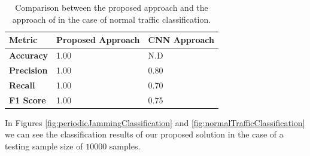 \documentclass[futureinternet,article,submit,pdftex,moreauthors]{Definitions/mdpi}
\begin{document}
\begin{table}[H]
	\caption{Comparison between the proposed approach and the approach of \cite{JammingDetectionIoT-Hussain} in the case of normal traffic classification.}\label{tab:normal_traffic_comparison}
	\begin{tabularx}{\textwidth}{CCC}
	\toprule
	\textbf{Metric} & \textbf{Proposed Approach} & \textbf{CNN Approach} \\
	\midrule
	\textbf{Accuracy}  & 1.00 & N.D \\
	\textbf{Precision} & 1.00 & 0.80 \\
	\textbf{Recall}    & 1.00 & 0.70 \\
	\textbf{F1 Score}  & 1.00 & 0.75 \\
	\bottomrule
	\end{tabularx}
\end{table}

In Figures \ref{fig:periodicJammingClassification} and \ref{fig:normalTrafficClassification} we can see the classification results of our proposed solution in the case of a testing sample size of $10000$ samples.
\end{document}
